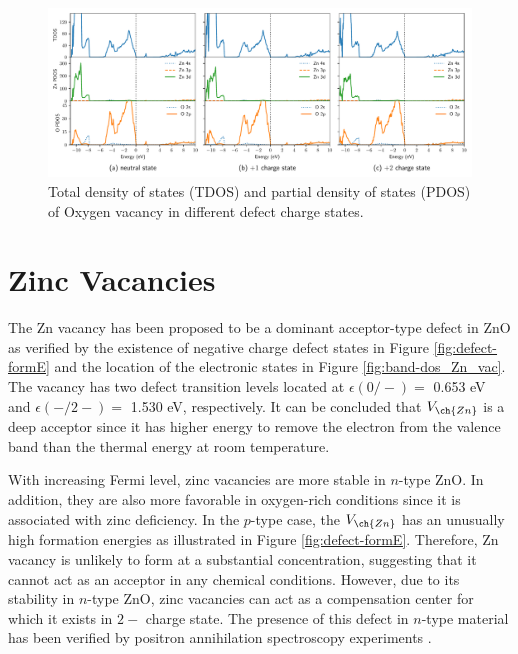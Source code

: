 \begin{figure}[tbh!]
	\centering
	\includegraphics[width=1\textwidth]{"images/rnd/O_v-dos"}
	\caption[Total density of states (TDOS) and partial density of states (PDOS) of Oxygen vacancy in different  defect charge states]{Total density of states (TDOS) and partial density of states (PDOS) of Oxygen vacancy in different  defect charge states.}
	\label{fig:dos-O_vac}
\end{figure}

\clearpage

\section{Zinc Vacancies}
The Zn vacancy has been proposed to be a dominant acceptor-type defect in ZnO as verified by the existence of negative charge defect states in Figure \ref{fig:defect-formE} and the location of the electronic states in Figure \ref{fig:band-dos_Zn_vac}. The  vacancy has two defect transition levels located at
$\epsilon(0/-)=$ 0.653 eV and  $\epsilon(-/2-)=$ 1.530 eV, respectively. It can be concluded that $V_{\ch{Zn}}$  is a deep acceptor since it has higher energy to remove the electron from the valence band than the thermal energy at room temperature.

With increasing Fermi level, zinc vacancies are more stable  in $n$-type ZnO. In addition, they are also more favorable in oxygen-rich conditions since it is associated with zinc deficiency. In the $p$-type case, the $V_{\ch{Zn}}$ has an unusually high formation energies as illustrated in Figure \ref{fig:defect-formE}. Therefore,  Zn vacancy is unlikely to form at a substantial concentration, suggesting that it cannot act as an acceptor in any chemical conditions. However, due to its stability in $n$-type ZnO, zinc vacancies can act as a compensation center for which it exists in $2-$ charge state. The presence of this defect in $n$-type material has been verified by positron annihilation spectroscopy experiments \citep{Tuomisto2003,Tuomisto2005}.

